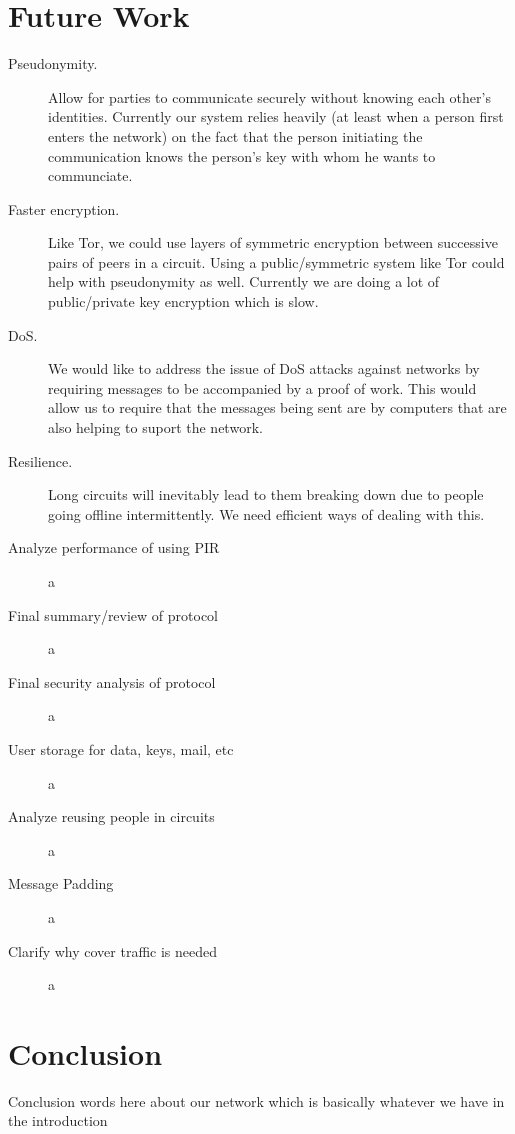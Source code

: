 \documentclass[twocolumn,11pt,english]{article}
\begin{document}
\section{Future Work}
\begin{description}
\item[Pseudonymity.] Allow for parties to communicate securely without knowing each other's identities. Currently our system relies heavily (at least when a person first enters the network) on the fact that the person initiating the communication knows the person's key with whom he wants to communciate.

\item[Faster encryption.] Like Tor, we could use layers of symmetric encryption between successive pairs of peers in a circuit. Using a public/symmetric system like Tor could help with pseudonymity as well. Currently we are doing a lot of public/private key encryption which is slow.

\item[DoS.] We would like to address the issue of DoS attacks against networks by requiring messages to be accompanied by a proof of work. This would allow us to require that the messages being sent are by computers that are also helping to suport the network.

\item[Resilience.] Long circuits will inevitably lead to them breaking down due to people going offline intermittently. We need efficient ways of dealing with this. 


\item[Analyze performance of using PIR] a

\item[Final summary/review of protocol]a

\item[Final security analysis of protocol]a

\item[User storage for data, keys, mail, etc]a

\item[Analyze reusing people in circuits]a

\item[Message Padding]a

\item[Clarify why cover traffic is needed]a
\end{description}
\section{Conclusion}
Conclusion words here about our network which is basically whatever we have in the introduction

\newpage



\end{document}
